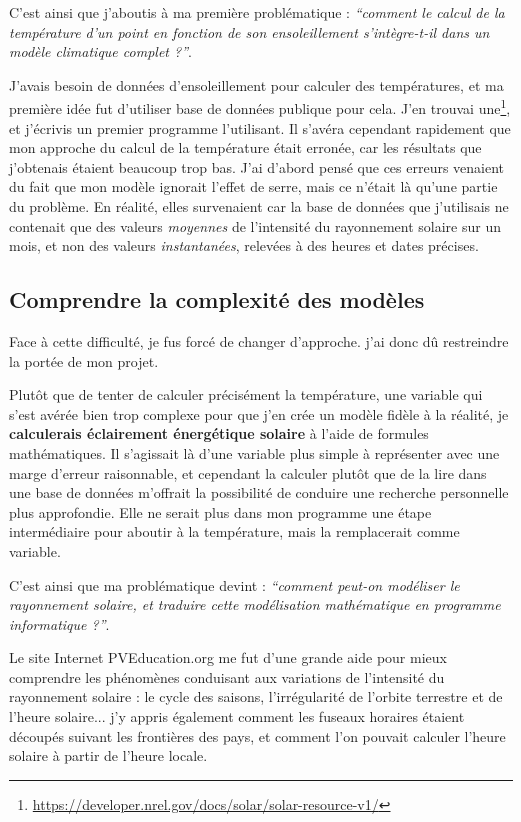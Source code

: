 \documentclass[12pt,a4paper]{article}
\begin{document}
C'est ainsi que j'aboutis à ma première problématique : \emph{``comment le calcul de la température d'un point en fonction de son ensoleillement s'intègre-t-il dans un modèle climatique complet ?''}.

J'avais besoin de données d'ensoleillement pour calculer des températures, et ma première idée fut d'utiliser base de données publique pour cela.
J'en trouvai une\footnote{\url{https://developer.nrel.gov/docs/solar/solar-resource-v1/}}, et j'écrivis un premier programme l'utilisant.
Il s'avéra cependant rapidement que mon approche du calcul de la température était erronée, car les résultats que j'obtenais étaient beaucoup trop bas.
J'ai d'abord pensé que ces erreurs venaient du fait que mon modèle ignorait l'effet de serre, mais ce n'était là qu'une partie du problème.
En réalité, elles survenaient car la base de données que j'utilisais ne contenait que des valeurs \emph{moyennes} de l'intensité du rayonnement solaire sur un mois, et non des valeurs \emph{instantanées}, relevées à des heures et dates précises.

\subsection{Comprendre la complexité des modèles}
Face à cette difficulté, je fus forcé de changer d'approche.
j'ai donc dû restreindre la portée de mon projet.

Plutôt que de tenter de calculer précisément la température, une variable qui s'est avérée bien trop complexe pour que j'en crée un modèle fidèle à la réalité, je \textbf{calculerais éclairement énergétique solaire} à l'aide de formules mathématiques.
Il s'agissait là d'une variable plus simple à représenter avec une marge d'erreur raisonnable, et cependant la calculer plutôt que de la lire dans une base de données m'offrait la possibilité de conduire une recherche personnelle plus approfondie.
Elle ne serait plus dans mon programme une étape intermédiaire pour aboutir à la température, mais la remplacerait comme variable.

C'est ainsi que ma problématique devint : \emph{``comment peut-on modéliser le rayonnement solaire, et traduire cette modélisation mathématique en programme informatique ?''}.

Le site Internet PVEducation.org me fut d'une grande aide pour mieux comprendre les phénomènes conduisant aux variations de l'intensité du rayonnement solaire : le cycle des saisons, l'irrégularité de l'orbite terrestre et de l'heure solaire... j'y appris également comment les fuseaux horaires étaient découpés suivant les frontières des pays, et comment l'on pouvait calculer l'heure solaire à partir de l'heure locale.
\end{document}
